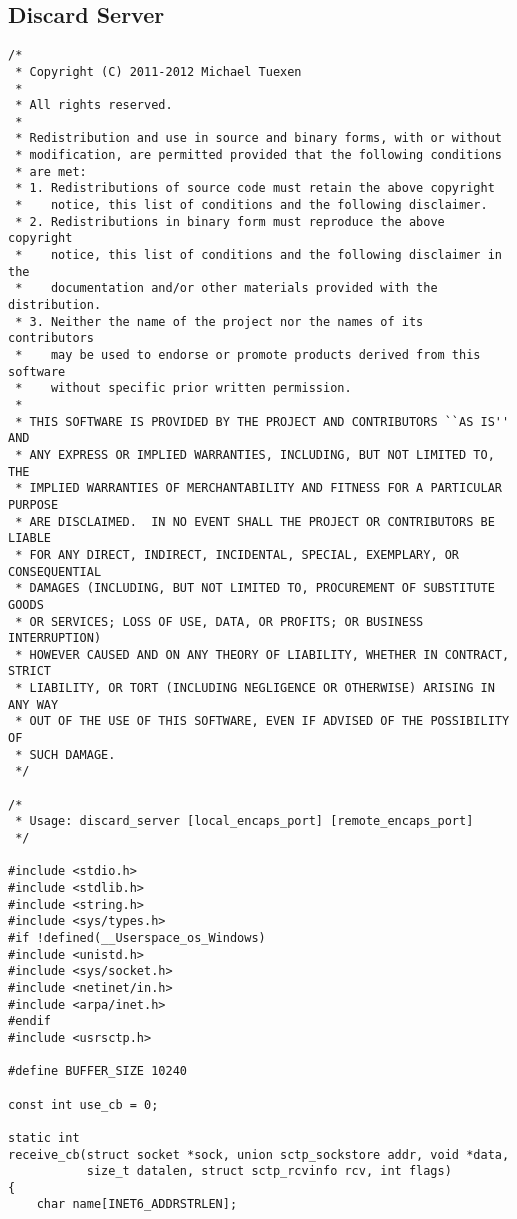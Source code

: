 \documentclass[a4paper]{article}
\begin{document}
\subsection{Discard Server}
\begin{verbatim}
/*
 * Copyright (C) 2011-2012 Michael Tuexen
 *
 * All rights reserved.
 *
 * Redistribution and use in source and binary forms, with or without
 * modification, are permitted provided that the following conditions
 * are met:
 * 1. Redistributions of source code must retain the above copyright
 *    notice, this list of conditions and the following disclaimer.
 * 2. Redistributions in binary form must reproduce the above copyright
 *    notice, this list of conditions and the following disclaimer in the
 *    documentation and/or other materials provided with the distribution.
 * 3. Neither the name of the project nor the names of its contributors
 *    may be used to endorse or promote products derived from this software
 *    without specific prior written permission.
 *
 * THIS SOFTWARE IS PROVIDED BY THE PROJECT AND CONTRIBUTORS ``AS IS'' AND
 * ANY EXPRESS OR IMPLIED WARRANTIES, INCLUDING, BUT NOT LIMITED TO, THE
 * IMPLIED WARRANTIES OF MERCHANTABILITY AND FITNESS FOR A PARTICULAR PURPOSE
 * ARE DISCLAIMED.	IN NO EVENT SHALL THE PROJECT OR CONTRIBUTORS BE LIABLE
 * FOR ANY DIRECT, INDIRECT, INCIDENTAL, SPECIAL, EXEMPLARY, OR CONSEQUENTIAL
 * DAMAGES (INCLUDING, BUT NOT LIMITED TO, PROCUREMENT OF SUBSTITUTE GOODS
 * OR SERVICES; LOSS OF USE, DATA, OR PROFITS; OR BUSINESS INTERRUPTION)
 * HOWEVER CAUSED AND ON ANY THEORY OF LIABILITY, WHETHER IN CONTRACT, STRICT
 * LIABILITY, OR TORT (INCLUDING NEGLIGENCE OR OTHERWISE) ARISING IN ANY WAY
 * OUT OF THE USE OF THIS SOFTWARE, EVEN IF ADVISED OF THE POSSIBILITY OF
 * SUCH DAMAGE.
 */

/*
 * Usage: discard_server [local_encaps_port] [remote_encaps_port]
 */

#include <stdio.h>
#include <stdlib.h>
#include <string.h>
#include <sys/types.h>
#if !defined(__Userspace_os_Windows)
#include <unistd.h>
#include <sys/socket.h>
#include <netinet/in.h>
#include <arpa/inet.h>
#endif
#include <usrsctp.h>

#define BUFFER_SIZE 10240

const int use_cb = 0;

static int
receive_cb(struct socket *sock, union sctp_sockstore addr, void *data,
           size_t datalen, struct sctp_rcvinfo rcv, int flags)
{
    char name[INET6_ADDRSTRLEN];


\end{verbatim}
\end{document}
